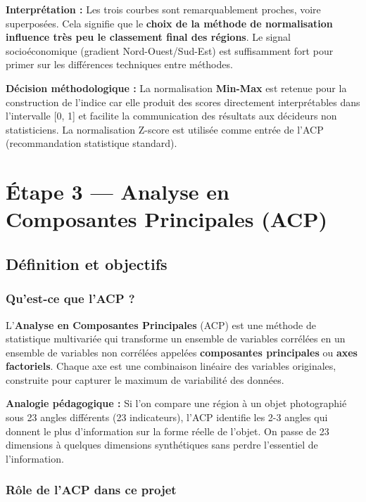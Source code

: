 \documentclass[
]{article}
\begin{document}
\textbf{Interprétation :} Les trois courbes sont remarquablement
proches, voire superposées. Cela signifie que le \textbf{choix de la
méthode de normalisation influence très peu le classement final des
régions}. Le signal socioéconomique (gradient Nord-Ouest/Sud-Est) est
suffisamment fort pour primer sur les différences techniques entre
méthodes.

\textbf{Décision méthodologique :} La normalisation \textbf{Min-Max} est
retenue pour la construction de l'indice car elle produit des scores
directement interprétables dans l'intervalle {[}0, 1{]} et facilite la
communication des résultats aux décideurs non statisticiens. La
normalisation Z-score est utilisée comme entrée de l'ACP (recommandation
statistique standard).

\newpage

\section{Étape 3 --- Analyse en Composantes Principales
(ACP)}\label{uxe9tape-3-analyse-en-composantes-principales-acp}

\subsection{Définition et objectifs}\label{duxe9finition-et-objectifs}

\subsubsection{Qu'est-ce que l'ACP ?}\label{quest-ce-que-lacp}

L'\textbf{Analyse en Composantes Principales} (ACP) est une méthode de
statistique multivariée qui transforme un ensemble de variables
corrélées en un ensemble de variables non corrélées appelées
\textbf{composantes principales} ou \textbf{axes factoriels}. Chaque axe
est une combinaison linéaire des variables originales, construite pour
capturer le maximum de variabilité des données.

\textbf{Analogie pédagogique :} Si l'on compare une région à un objet
photographié sous 23 angles différents (23 indicateurs), l'ACP identifie
les 2-3 angles qui donnent le plus d'information sur la forme réelle de
l'objet. On passe de 23 dimensions à quelques dimensions synthétiques
sans perdre l'essentiel de l'information.

\subsubsection{Rôle de l'ACP dans ce
projet}\label{ruxf4le-de-lacp-dans-ce-projet}
\end{document}
